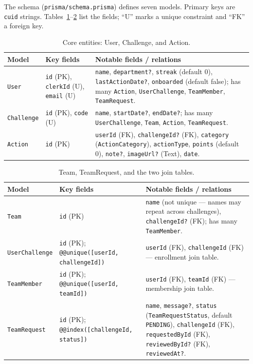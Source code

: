 \documentclass[11pt]{article}
\begin{document}
The schema (\texttt{prisma/schema.prisma}) defines seven models. Primary keys
are \texttt{cuid} strings. Tables~\ref{tab:core}--\ref{tab:join} list the
fields; ``U'' marks a unique constraint and ``FK'' a foreign key.

\begin{table}[H]
\centering
\caption{Core entities: User, Challenge, and Action.}
\label{tab:core}
\begin{tabular}{p{2.6cm} p{4.0cm} p{5.6cm}}
\toprule
Model & Key fields & Notable fields / relations \\
\midrule
\texttt{User} &
\texttt{id} (PK), \texttt{clerkId} (U), \texttt{email} (U) &
\texttt{name}, \texttt{department?}, \texttt{streak} (default 0),
\texttt{lastActionDate?}, \texttt{onboarded} (default false); has many
\texttt{Action}, \texttt{UserChallenge}, \texttt{TeamMember}, \texttt{TeamRequest}. \\
\addlinespace
\texttt{Challenge} &
\texttt{id} (PK), \texttt{code} (U) &
\texttt{name}, \texttt{startDate?}, \texttt{endDate?}; has many
\texttt{UserChallenge}, \texttt{Team}, \texttt{Action}, \texttt{TeamRequest}. \\
\addlinespace
\texttt{Action} &
\texttt{id} (PK) &
\texttt{userId} (FK), \texttt{challengeId?} (FK), \texttt{category}
(\texttt{ActionCategory}), \texttt{actionType}, \texttt{points} (default 0),
\texttt{note?}, \texttt{imageUrl?} (Text), \texttt{date}. \\
\bottomrule
\end{tabular}
\end{table}

\begin{table}[H]
\centering
\caption{Team, TeamRequest, and the two join tables.}
\label{tab:join}
\begin{tabular}{p{2.8cm} p{4.0cm} p{5.4cm}}
\toprule
Model & Key fields & Notable fields / relations \\
\midrule
\texttt{Team} &
\texttt{id} (PK) &
\texttt{name} (not unique --- names may repeat across challenges),
\texttt{challengeId?} (FK); has many \texttt{TeamMember}. \\
\addlinespace
\texttt{UserChallenge} &
\texttt{id} (PK); \texttt{@@unique([userId, challengeId])} &
\texttt{userId} (FK), \texttt{challengeId} (FK) --- enrollment join table. \\
\addlinespace
\texttt{TeamMember} &
\texttt{id} (PK); \texttt{@@unique([userId, teamId])} &
\texttt{userId} (FK), \texttt{teamId} (FK) --- membership join table. \\
\addlinespace
\texttt{TeamRequest} &
\texttt{id} (PK); \texttt{@@index([challengeId, status])} &
\texttt{name}, \texttt{message?}, \texttt{status}
(\texttt{TeamRequestStatus}, default \texttt{PENDING}), \texttt{challengeId}
(FK), \texttt{requestedById} (FK), \texttt{reviewedById?} (FK),
\texttt{reviewedAt?}. \\
\bottomrule
\end{tabular}
\end{table}
\end{document}
